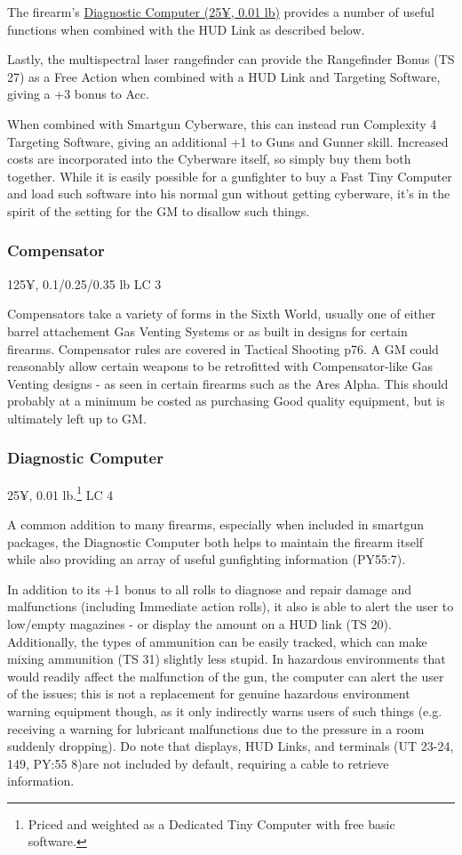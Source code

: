 The firearm's \hyperref[diagnostic_computer]{Diagnostic Computer (25¥, 0.01 lb)} provides a number of useful functions when combined with the HUD Link as described below.

Lastly, the multispectral laser rangefinder can provide the Rangefinder Bonus (TS 27) as a Free Action when combined with a HUD Link and Targeting Software, giving a +3 bonus to Acc.

When combined with Smartgun Cyberware, this can instead run Complexity 4 Targeting Software, giving an additional +1 to Guns and Gunner skill. Increased costs are incorporated into the Cyberware itself, so simply buy them both together. While it is easily possible for a gunfighter to buy a Fast Tiny Computer and load such software into his normal gun without getting cyberware, it's in the spirit of the setting for the GM to disallow such things. 

\subsubsection{Compensator}
125¥, 0.1/0.25/0.35 lb LC 3

Compensators take a variety of forms in the Sixth World, usually one of either barrel attachement Gas Venting Systems or as built in designs for certain firearms. Compensator rules are covered in Tactical Shooting p76. A GM could reasonably allow certain weapons to be retrofitted with Compensator-like Gas Venting designs - as seen in certain firearms such as the Ares Alpha. This should probably at a minimum be costed as purchasing Good quality equipment, but is ultimately left up to GM.

\subsubsection{Diagnostic Computer}\label{diagnostic_computer}
25¥, 0.01 lb.\footnote{Priced and weighted as a Dedicated Tiny Computer with free basic software.} LC 4

A common addition to many firearms, especially when included in smartgun packages, the Diagnostic Computer both helps to maintain the firearm itself while also providing an array of useful gunfighting information (PY55:7). 

In addition to its +1 bonus to all rolls to diagnose and repair damage and malfunctions (including Immediate action rolls), it also is able to alert the user to low/empty magazines - or display the amount on a HUD link (TS 20). Additionally, the types of ammunition can be easily tracked, which can make mixing ammunition (TS 31) slightly less stupid. In hazardous environments that would readily affect the malfunction of the gun, the computer can alert the user of the issues; this is not a replacement for genuine hazardous environment warning equipment though, as it only indirectly warns users of such things (e.g. receiving a warning for lubricant malfunctions due to the pressure in a room suddenly dropping). Do note that displays, HUD Links, and terminals (UT 23-24, 149, PY:55 8)are not included by default, requiring a cable to retrieve information.

